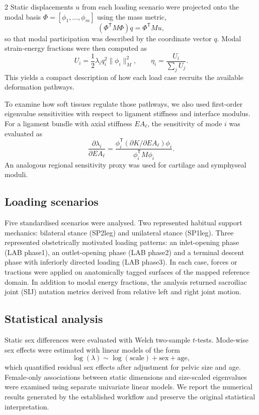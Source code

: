 \documentclass[openacc]{rsproca_new}
\begin{document}
\begin{multicols}{2}
Static displacements $u$ from each loading scenario were projected onto the modal basis $\Phi = [\phi_1,\ldots,\phi_m]$ using the mass metric,
\begin{equation}
(\Phi^{\mathsf T} M \Phi) q = \Phi^{\mathsf T} M u,
\end{equation}
so that modal participation was described by the coordinate vector $q$. Modal strain-energy fractions were then computed as
\begin{equation}
U_i = \frac{1}{2}\lambda_i q_i^2 \lVert \phi_i \rVert_M^2, \qquad
\eta_i = \frac{U_i}{\sum_j U_j}.
\end{equation}
This yields a compact description of how each load case recruits the available deformation pathways.

To examine how soft tissues regulate those pathways, we also used first-order eigenvalue sensitivities with respect to ligament stiffness and interface modulus. For a ligament bundle with axial stiffness $EA_\ell$, the sensitivity of mode $i$ was evaluated as
\begin{equation}
\frac{\partial \lambda_i}{\partial EA_\ell} =
\frac{\phi_i^{\mathsf T} \left(\partial K / \partial EA_\ell\right) \phi_i}{\phi_i^{\mathsf T} M \phi_i}.
\end{equation}
An analogous regional sensitivity proxy was used for cartilage and symphyseal moduli.

\subsection{Loading scenarios}

Five standardised scenarios were analysed. Two represented habitual support mechanics: bilateral stance (SP2leg) and unilateral stance (SP1leg). Three represented obstetrically motivated loading patterns: an inlet-opening phase (LAB phase1), an outlet-opening phase (LAB phase2) and a terminal descent phase with inferiorly directed loading (LAB phase3). In each case, forces or tractions were applied on anatomically tagged surfaces of the mapped reference domain. In addition to modal energy fractions, the analysis returned sacroiliac joint (SIJ) nutation metrics derived from relative left and right joint motion.

\subsection{Statistical analysis}

Static sex differences were evaluated with Welch two-sample $t$-tests. Mode-wise sex effects were estimated with linear models of the form
\begin{equation}
\log(\lambda) \sim \log(\mathrm{scale}) + \mathrm{sex} + \mathrm{age},
\end{equation}
which quantified residual sex effects after adjustment for pelvic size and age. Female-only associations between static dimensions and size-scaled eigenvalues were examined using separate univariate linear models. We report the numerical results generated by the established workflow and preserve the original statistical interpretation.


\end{multicols}
\end{document}

